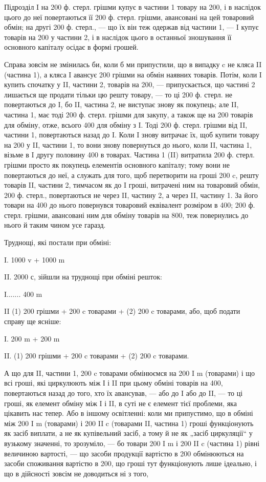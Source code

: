 Підрозділ I на 200 ф. стерл. грішми купує в частини 1 товару на
200, і в наслідок цього до неї повертаються її 200 ф. стерл. грішми,
авансовані на цей товаровий обмін; на другі 200 ф. стерл., — що їх він
теж одержав від частини 1, — I купує товарів на 200 у частини 2, і в
наслідок цього в останньої зношування її основного капіталу осідає в
формі грошей.

Справа зовсім не змінилась би, коли б ми припустили, що в випадку
c не кляса II (частина 1), а кляса I авансує 200 грішми на обмін наявних
товарів. Потім, коли I купить спочатку у II, частини 2, товарів на
200, — припускається, що частині 2 лишається ще продати тільки цю
решту товару, — то ці 200 ф. стерл. не повертаються до I, бо II, частина
2, не виступає знову як покупець; але II, частина 1, має тоді 200 ф. стерл.
грішми для закупу, а також ще на 200 товарів для обміну, отже, всього
400 для обміну з I. Тоді 200 ф. стерл. грішми від    II, частини 1, повертаються
назад до I. Коли I знову витрачає їх, щоб купити    товару на
200 у II, частини 1, то вони знову повернуться до нього, коли II,
частина 1, візьме в I другу половину 400 в товарах. Частина 1 (II)
витратила 200 ф. стерл. грішми просто як покупець елементів основного
капіталу; тому вони не повертаються до неї, а служать для того,
щоб перетворити на гроші 200 c, решту товарів II, частини 2, тимчасом
як до I гроші, витрачені ним на товаровий обмін, 200 ф. стерл., повертаються
не через II, частину 2, а через II, частину 1. За його товари
на 400 до нього повернувся товаровий еквівалент розміром в 400;
200 ф. стерл. грішми, авансовані ним для обміну товарів на 800, теж
повернулись до нього й таким чином усе гаразд.

Труднощі, які постали при обміні:

I.    1000 v + 1000 m

II.    2000 с, зійшли на труднощі при обміні решток:

I....... 400 m

II (1) 200 грішми + 200 c товарами + (2) 200 c товарами, або, щоб
подати справу ще ясніше:

I.    200 m + 200 m

II. (1) 200 грішми + 200 c товарами + (2) 200 c товарами.

А що для II, частини 1, 200 c товарами обмінюємся на 200 I m
(товарами) і що всі гроші, які циркулюють між І і II при цьому обміні
товарів на 400, повертаються назад до того, хто їх авансував, — або до
I або до II, — то ці гроші, як елемент обміну між I і II, в суті не є
елемент тієї проблеми, яка цікавить нас тепер. Або в іншому освітленні:
коли ми припустимо, що в обміні між 200 I m (товарами) і 200 II c
(товарами II, частина 1) гроші функціонують як засіб виплати, а не як
купівельний засіб, а тому й не як „засіб циркуляції“ у вузькому значенні,
то зрозуміло, — бо товари 200 I m і 200 II c (частина 1)
рівні величиною вартості, — що засоби продукції вартістю в 200 обмінюються
на засоби споживання вартістю в 200, що гроші тут функціонують
лише ідеально, і що в дійсності зовсім не доводиться ні з того,
\parbreak{}  %
